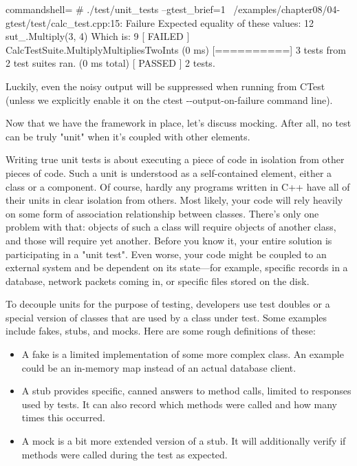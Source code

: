 \begin{tcblisting}{commandshell={}}
# ./test/unit_tests --gtest_brief=1
~/examples/chapter08/04-gtest/test/calc_test.cpp:15: Failure
Expected equality of these values:
  12
  sut_.Multiply(3, 4)
    Which is: 9
[ FAILED ] CalcTestSuite.MultiplyMultipliesTwoInts (0 ms)
[==========] 3 tests from 2 test suites ran. (0 ms total)
[ PASSED ] 2 tests.
\end{tcblisting}

Luckily, even the noisy output will be suppressed when running from CTest (unless we explicitly enable it on the ctest -{}-output-on-failure command line).

Now that we have the framework in place, let's discuss mocking. After all, no test can be truly "unit" when it's coupled with other elements.


Writing true unit tests is about executing a piece of code in isolation from other pieces of code. Such a unit is understood as a self-contained element, either a class or a component. Of course, hardly any programs written in C++ have all of their units in clear isolation from others. Most likely, your code will rely heavily on some form of association relationship between classes. There's only one problem with that: objects of such a class will require objects of another class, and those will require yet another. Before you know it, your entire solution is participating in a "unit test". Even worse, your code might be coupled to an external system and be dependent on its state—for example, specific records in a database, network packets coming in, or specific files stored on the disk.

To decouple units for the purpose of testing, developers use test doubles or a special version of classes that are used by a class under test. Some examples include fakes, stubs, and mocks. Here are some rough definitions of these:

\begin{itemize}
\item 
A fake is a limited implementation of some more complex class. An example could be an in-memory map instead of an actual database client.

\item 
A stub provides specific, canned answers to method calls, limited to responses used by tests. It can also record which methods were called and how many times this occurred.

\item 
A mock is a bit more extended version of a stub. It will additionally verify if methods were called during the test as expected.
\end{itemize}

